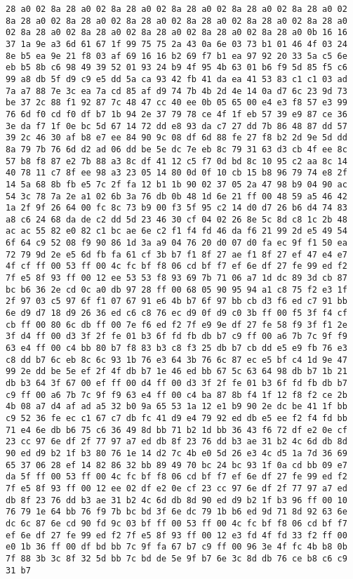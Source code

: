 \documentclass{article}
\begin{document}
\begin{verbatim}
28 a0 02 8a 28 a0 02 8a 28 a0 02 8a 28 a0 02 8a 28 a0 02 8a 28 a0 02 8a 28 a0 02 8a 28 a0 02 8a 28 a0 02 8a 28 a0 02 8a 28 a0 02 8a 28 a0 02 8a 28 a0 02 8a 28 a0 02 8a 28 a0 02 8a 28 a0 02 8a 28 a0 0b 16 16 37 1a 9e a3 6d 61 67 1f 99 75 75 2a 43 0a 6e 03 73 b1 01 46 4f 03 24 8e b5 ea 9e 21 f8 03 af 69 16 16 b2 69 f7 b1 ea 97 92 20 33 5a c5 6e eb b5 8b c6 98 49 39 52 01 93 24 b9 4f 95 4b 63 01 b6 f9 5d 85 f5 c6 99 a8 db 5f d9 c9 e5 dd 5a ca 93 42 fb 41 da ea 41 53 83 c1 c1 03 ad 7a a7 88 7e 3c ea 7a cd 85 af d9 74 7b 4b 2d 4e 14 0a d7 6c 23 9d 73 be 37 2c 88 f1 92 87 7c 48 47 cc 40 ee 0b 05 65 00 e4 e3 f8 57 e3 99 76 6d f0 cd f0 df b7 1b 94 2e 37 79 78 ce 4f 1f eb 57 39 e9 87 ce 36 3e da f7 1f 0e bc 5d 67 14 72 dd e8 93 da c7 27 dd 7b 86 48 87 dd 57 39 2c 46 30 af b8 e7 ee 84 90 9c 08 df 6d 88 fe 27 f8 b2 2d 9e 5d dd 8a 79 7b 76 6d d2 ad 06 dd be 5e dc 7e eb 8c 79 31 63 d3 cb 4f ee 8c 57 b8 f8 87 e2 7b 88 a3 8c df 41 12 c5 f7 0d bd 8c 10 95 c2 aa 8c 14 40 78 11 c7 8f ee 98 a3 23 05 14 80 0d 0f 10 cb 15 b8 96 79 74 e8 2f 14 5a 68 8b fb e5 7c 2f fa 12 b1 1b 90 02 37 05 2a 47 98 b9 04 90 ac 54 3c 78 7a 2e a1 02 6b 3a 76 db 0b 48 1d 6e 21 ff 00 48 59 a5 46 42 1a 2f 9f 26 64 00 fc 8c 73 b9 00 f3 5f 95 c2 14 d0 d7 26 b6 d4 74 83 a8 c6 24 68 da de c2 dd 5d 23 46 30 cf 04 02 26 8e 5c 8d c8 1c 2b 48 ac ac 55 82 e0 82 c1 bc ae 6e c2 f1 f4 fd 46 da f6 21 99 2d e5 49 54 6f 64 c9 52 08 f9 90 86 1d 3a a9 04 76 20 d0 07 d0 fa ec 9f f1 50 ea 72 79 9d 2e e5 6d fb fa 61 cf 3b b7 f1 8f 27 ae f1 8f 27 ef 47 e4 e7 4f cf ff 00 53 ff 00 4c fc bf f8 06 cd bf f7 ef 6e df 27 fe 99 ed f2 7f e5 8f 93 ff 00 12 ee 53 53 f8 93 69 7b 71 06 a7 1d dc 89 3d cb 87 bc b6 36 2e cd 0c a0 db 97 28 ff 00 68 05 90 95 94 a1 c8 75 f2 e3 1f 2f 97 03 c5 97 6f f1 07 67 91 e6 4b b7 6f 97 bb cb d3 f6 ed c7 91 bb 6e d9 d7 18 d9 26 36 ed c6 c8 76 ec d9 0f d9 c0 3b ff 00 f5 3f f4 cf cb ff 00 80 6c db ff 00 7e f6 ed f2 7f e9 9e df 27 fe 58 f9 3f f1 2e 3f d4 ff 00 d3 3f 2f fe 01 b3 6f fd fb db b7 c9 ff 00 a6 7b 7c 9f f9 63 e4 ff 00 c4 bb 80 b7 f8 83 b3 c8 f3 25 db b7 cb dd e5 e9 fb 76 e3 c8 dd b7 6c eb 8c 6c 93 1b 76 e3 64 3b 76 6c 87 ec e5 bf c4 1d 9e 47 99 2e dd be 5e ef 2f 4f db b7 1e 46 ed bb 67 5c 63 64 98 db b7 1b 21 db b3 64 3f 67 00 ef ff 00 d4 ff 00 d3 3f 2f fe 01 b3 6f fd fb db b7 c9 ff 00 a6 7b 7c 9f f9 63 e4 ff 00 c4 ba 87 8b f4 1f 12 f8 f2 ce 2b 4b 08 a7 d4 af ad a5 32 b0 9a 65 53 1a 12 e1 b9 90 2e dc be 41 1f bb c9 52 36 fe ec c1 67 c7 db fc 41 d9 e4 79 92 ed db e5 ee f2 f4 fd bb 71 e4 6e db b6 75 c6 36 49 8d bb 71 b2 1d bb 36 43 f6 72 df e2 0e cf 23 cc 97 6e df 2f 77 97 a7 ed db 8f 23 76 dd b3 ae 31 b2 4c 6d db 8d 90 ed d9 b2 1f b3 80 76 1e 14 d2 7c 4b e0 5d 26 e3 4c d5 1a 7d 36 69 65 37 06 28 ef 14 82 86 32 bb 89 49 70 bc 24 bc 93 1f 0a cd bb 09 e7 da 5f ff 00 53 ff 00 4c fc bf f8 06 cd bf f7 ef 6e df 27 fe 99 ed f2 7f e5 8f 93 ff 00 12 ee 02 df e2 0e cf 23 cc 97 6e df 2f 77 97 a7 ed db 8f 23 76 dd b3 ae 31 b2 4c 6d db 8d 90 ed d9 b2 1f b3 96 ff 00 10 76 79 1e 64 bb 76 f9 7b bc bd 3f 6e dc 79 1b b6 ed 9d 71 8d 92 63 6e dc 6c 87 6e cd 90 fd 9c 03 bf ff 00 53 ff 00 4c fc bf f8 06 cd bf f7 ef 6e df 27 fe 99 ed f2 7f e5 8f 93 ff 00 12 e3 fd 4f fd 33 f2 ff 00 e0 1b 36 ff 00 df bd bb 7c 9f fa 67 b7 c9 ff 00 96 3e 4f fc 4b b8 0b 7f 88 3b 3c 8f 32 5d bb 7c bd de 5e 9f b7 6e 3c 8d db 76 ce b8 c6 c9 31 b7 
\end{verbatim}
\end{document}
